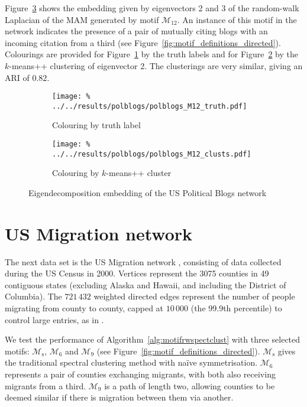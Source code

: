 \documentclass[12pt]{ociamthesis}
\theoremstyle{plain}
\theoremstyle{definition}
\theoremstyle{remark}
\newcommand\ca[1]{\mathcal{#1}}
\begin{document}
Figure~\ref{fig:polblogs_embedding} shows the embedding given by eigenvectors 2
and 3 of the random-walk Laplacian of the MAM generated by motif $\ca{M}_{12}$.
An instance of this motif in the network indicates the presence of a pair of
mutually citing blogs with an incoming citation from a third (see
Figure~\ref{fig:motif_definitions_directed}). Colourings are provided for
Figure~\ref{fig:polblogs_embedding_truth} by the truth labels and for
Figure~\ref{fig:polblogs_embedding_kmeans} by the $k$-means++ clustering of
eigenvector 2. The clusterings are very similar, giving an ARI of $0.82$.

\vspace*{0.5cm}
\begin{figure}[H]
\begin{subfigure}{.49\textwidth}
\centering
\texttt{[image: \%
../../results/polblogs/polblogs\_M12\_truth.pdf]}
\caption{Colouring by truth label}
\label{fig:polblogs_embedding_truth}
\end{subfigure}
\begin{subfigure}{.49\textwidth}
\centering
\texttt{[image: \%
../../results/polblogs/polblogs\_M12\_clusts.pdf]}
\caption{Colouring by $k$-means++ cluster}
\label{fig:polblogs_embedding_kmeans}
\end{subfigure}
\caption{Eigendecomposition embedding of the US Political Blogs network}
\label{fig:polblogs_embedding}
\end{figure}

\pagebreak

\section{US Migration network} \label{sec:motif_migration}

The next data set is the US Migration network \cite{census2000}, consisting of
data collected during the US Census in 2000. Vertices represent the 3075
counties in 49 contiguous states (excluding Alaska and Hawaii, and including
the District of Columbia). The $721\,432$ weighted directed edges represent the
number of people migrating from county to county, capped at $10 \, 000$ (the
99.9th percentile) to control large entries, as in \cite{DirectedClustImbCuts}.

We test the performance of Algorithm~\ref{alg:motifrwspectclust} with three
selected motifs: $\ca{M}_\mathrm{s}$, $\ca{M}_6$ and $\ca{M}_9$ (see
Figure~\ref{fig:motif_definitions_directed}).
$\ca{M}_\mathrm{s}$ gives the traditional spectral clustering method with
na\"ive symmetrisation.
$\ca{M}_6$ represents a pair of counties exchanging migrants, with both also
receiving migrants from a third.
$\ca{M}_9$ is a path of length two, allowing counties to be deemed similar if
there is migration between them via another.
\end{document}
